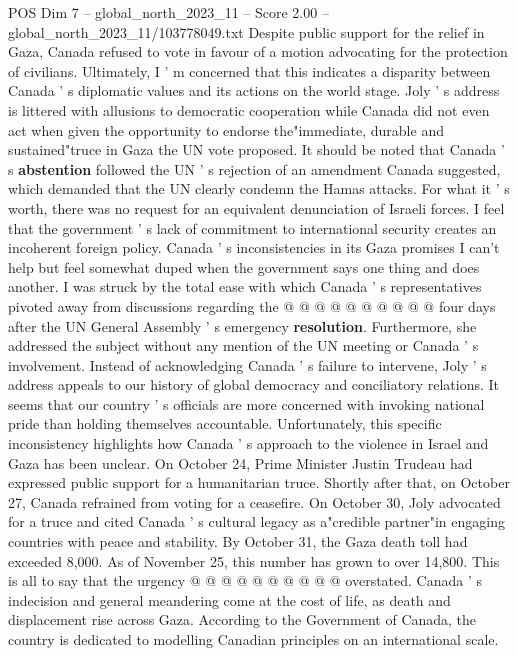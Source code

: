 \begin{textsample}{POS Dim 7 – global\_north\_2023\_11 – Score 2.00 – global\_north\_2023\_11/103778049.txt}  \label{ex:f7_pos_409}
Despite public support for the relief in Gaza, Canada refused to vote in favour of a motion advocating for the protection of civilians.
Ultimately, I ' m concerned that this indicates a disparity between Canada ' s diplomatic values and its actions on the world stage.
Joly ' s address is littered with allusions to democratic cooperation while Canada did not even act when given the opportunity to endorse the"immediate, durable and sustained"truce in Gaza the UN vote proposed.
It should be noted that Canada ' s \textbf{abstention} followed the UN ' s rejection of an amendment Canada suggested, which demanded that the UN clearly condemn the Hamas attacks.
For what it ' s worth, there was no request for an equivalent denunciation of Israeli forces.
I feel that the government ' s lack of commitment to international security creates an incoherent foreign policy.
Canada ' s inconsistencies in its Gaza promises I can't help but feel somewhat duped when the government says one thing and does another.
I was struck by the total ease with which Canada ' s representatives pivoted away from discussions regarding the @ @ @ @ @ @ @ @ @ @ four days after the UN General Assembly ' s emergency \textbf{resolution}.
Furthermore, she addressed the subject without any mention of the UN meeting or Canada ' s involvement.
Instead of acknowledging Canada ' s failure to intervene, Joly ' s address appeals to our history of global democracy and conciliatory relations.
It seems that our country ' s officials are more concerned with invoking national pride than holding themselves accountable.
Unfortunately, this specific inconsistency highlights how Canada ' s approach to the violence in Israel and Gaza has been unclear.
On October 24, Prime Minister Justin Trudeau had expressed public support for a humanitarian truce.
Shortly after that, on October 27, Canada refrained from voting for a ceasefire.
On October 30, Joly advocated for a truce and cited Canada ' s cultural legacy as a"credible partner"in engaging countries with peace and stability.
By October 31, the Gaza death toll had exceeded 8,000.
As of November 25, this number has grown to over 14,800.
This is all to say that the urgency @ @ @ @ @ @ @ @ @ @ overstated.
Canada ' s indecision and general meandering come at the cost of life, as death and displacement rise across Gaza.
According to the Government of Canada, the country is dedicated to modelling Canadian principles on an international scale.

\end{textsample}
